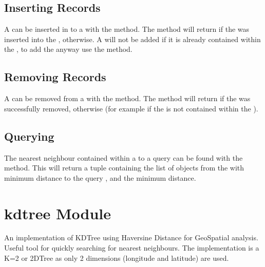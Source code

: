 \documentclass[letterpaper,10pt,english]{sphinxmanual}
\begin{document}
\subsection{Inserting Records}
\label{\detokenize{kdtree:inserting-records}}
\sphinxAtStartPar
A  can be inserted in to a  with the  method. The method will return  if
the  was inserted into the ,  otherwise. A  will not be added if it is already
contained within the , to add the  anyway use the  method.


\subsection{Removing Records}
\label{\detokenize{kdtree:removing-records}}
\sphinxAtStartPar
A  can be removed from a  with the  method. The method will return  if the
 was successfully removed,  otherwise (for example if the  is not contained within the
).


\subsection{Querying}
\label{\detokenize{kdtree:querying}}
\sphinxAtStartPar
The nearest neighbour  contained within a  to a query  can be found with the
 method. This will return a tuple containing the list of  objects from the  with
minimum distance to the query , and the minimum distance.


\section{kdtree Module}
\label{\detokenize{kdtree:module-GeoSpatialTools.kdtree}}\label{\detokenize{kdtree:kdtree-module}}
\sphinxAtStartPar
An implementation of KDTree using Haversine Distance for GeoSpatial analysis.
Useful tool for quickly searching for nearest neighbours. The implementation is
a K=2 or 2DTree as only 2 dimensions (longitude and latitude) are used.
\end{document}
